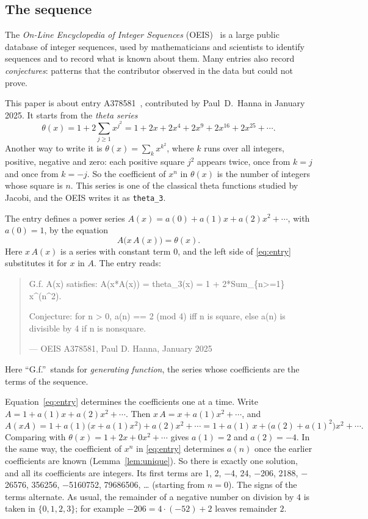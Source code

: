 \documentclass[11pt,a4paper]{article}
\theoremstyle{definition}
\theoremstyle{remark}
\begin{document}
\subsection{The sequence}\label{sec:sequence}
The \emph{On-Line Encyclopedia of Integer Sequences} (OEIS)~\cite{oeisdb} is a large public database of integer
sequences, used by mathematicians and scientists to identify sequences and to record what is known about them. Many
entries also record \emph{conjectures}: patterns that the contributor observed in the data but could not prove.

This paper is about entry A378581~\cite{oeis}, contributed by Paul~D.~Hanna in January 2025. It starts from the
\emph{theta series}
\[
\theta(x)=1+2\sum_{j\ge1}x^{j^2}=1+2x+2x^4+2x^9+2x^{16}+2x^{25}+\cdots .
\]
Another way to write it is $\theta(x)=\sum_{k}x^{k^2}$, where $k$ runs over all integers, positive, negative and zero:
each positive square $j^2$ appears twice, once from $k=j$ and once from $k=-j$. So the coefficient of $x^n$ in
$\theta(x)$ is the number of integers whose square is $n$. This series is one of the classical theta functions studied
by Jacobi, and the OEIS writes it as \texttt{theta\_3}.

The entry defines a power series $A(x)=a(0)+a(1)x+a(2)x^2+\cdots$, with $a(0)=1$, by the equation
\begin{equation}\label{eq:entry}
A\bigl(x\,A(x)\bigr)=\theta(x) .
\end{equation}
Here $x\,A(x)$ is a series with constant term $0$, and the left side of \eqref{eq:entry} substitutes
it for $x$ in $A$. The entry reads:
\begin{quote}\small\ttfamily\raggedright G.f. A(x) satisfies: A(x*A(x)) = theta\_3(x) = 1 + 2*Sum\_\{n>=1\} x\^{}(n\^{}2).\par\smallskip Conjecture: for n > 0, a(n) == 2 (mod 4) iff n is square, else a(n) is divisible by 4 if n is nonsquare.\par\smallskip\hfill\textrm{--- OEIS A378581, Paul D. Hanna, January 2025}\end{quote}

Here ``G.f.''\ stands for \emph{generating function}, the series whose coefficients are the terms of the sequence.

Equation~\eqref{eq:entry} determines the coefficients one at a time. Write $A=1+a(1)x+a(2)x^2+\cdots$. Then
$x\,A=x+a(1)x^2+\cdots$, and
\[
A(xA)=1+a(1)\bigl(x+a(1)x^2\bigr)+a(2)x^2+\cdots=1+a(1)\,x+\bigl(a(2)+a(1)^2\bigr)x^2+\cdots .
\]
Comparing with $\theta(x)=1+2x+0x^2+\cdots$ gives $a(1)=2$ and $a(2)=-4$. In the same way, the coefficient
of $x^n$ in \eqref{eq:entry} determines $a(n)$ once the earlier coefficients are known (Lemma~\ref{lem:unique}). So
there is exactly one solution, and all its coefficients are integers. Its first terms are
1, 2, $-$4, 24, $-$206, 2188, $-$26576, 356256, $-$5160752, 79686506, \dots{} (starting from $n=0$). The signs of the terms alternate. As usual, the remainder of a negative number on division by $4$ is
taken in $\{0,1,2,3\}$; for example $-206=4\cdot(-52)+2$ leaves remainder $2$.
\end{document}
